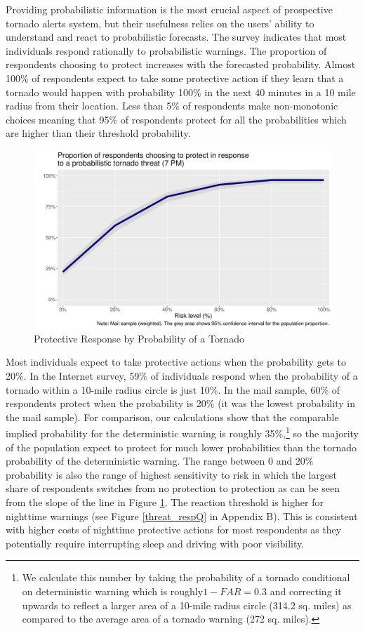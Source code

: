 \documentclass{ametsocV6.1}
\begin{document}
Providing probabilistic information is the most crucial aspect of prospective tornado alerts system, but their usefulness relies on the users' ability to understand and react to probabilistic forecasts. The survey indicates that most individuals respond rationally to probabilistic warnings. The proportion of respondents choosing to protect increases with the forecasted probability. Almost 100\% of respondents expect to take some protective action if they learn that a tornado would happen with probability 100\% in the next 40 minutes in a 10 mile radius from their location. Less than 5\% of respondents make non-monotonic choices meaning that 95\% of respondents protect for all the probabilities which are higher than their threshold probability.
\begin{figure}[!htbp]
\centering
\includegraphics[width=27pc]{../Graphs/threat_resp_mail_w.pdf} 
\caption{Protective Response by Probability of a Tornado}\label{threat_resp_mail}
\end{figure}

Most individuals expect to take protective actions when the probability gets to 20\%.  In the Internet survey, 59\% of individuals respond when the probability of a tornado within a 10-mile radius  circle is just 10\%. In the mail sample, 60\% of respondents protect when the probability is 20\% (it was the lowest probability in the mail sample). For comparison, our calculations show that the comparable implied probability for the deterministic warning is roughly 35\%,\footnote{We calculate this number by taking the probability of a tornado conditional on deterministic warning which is roughly$1-FAR=0.3$ \citep{simmons_economic_2013} and correcting it upwards to reflect a larger area of a 10-mile radius circle (314.2 sq. miles) as compared to the average area of a tornado warning (272 sq. miles).}   so the majority of the population expect to protect for much lower probabilities than the tornado probability of the deterministic warning. The range between 0 and 20\% probability is also the range of highest sensitivity to risk in which the largest share of respondents switches from no protection to protection as can be seen from the slope of the line in Figure \ref{threat_resp_mail}.  The reaction threshold is higher for nighttime warnings (see Figure \ref{threat_respQ} in Appendix B). This is consistent with higher costs of nighttime protective actions for most respondents as they potentially require interrupting sleep and driving with poor visibility.
\end{document}
